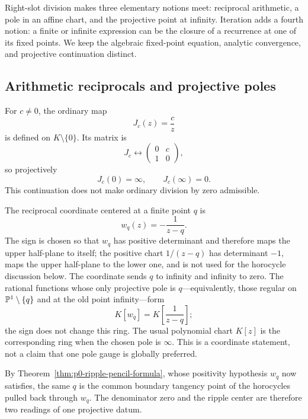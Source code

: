 Right-slot division makes three elementary notions meet: reciprocal
arithmetic, a pole in an affine chart, and the projective point at infinity.
Iteration adds a fourth notion: a finite or infinite expression can be the
closure of a recurrence at one of its fixed points.  We keep the algebraic
fixed-point equation, analytic convergence, and projective continuation
distinct.

\subsection{Arithmetic reciprocals and projective poles}

For $c\ne0$, the ordinary map
\[
  J_c(z)=\frac{c}{z}
\]
is defined on $K\setminus\{0\}$.  Its matrix is
\[
  J_c\leftrightarrow
  \begin{pmatrix}0&c\\1&0\end{pmatrix},
\]
so projectively
\[
  J_c(0)=\infty,
  \qquad
  J_c(\infty)=0.
\]
This continuation does not make ordinary division by zero admissible.

The reciprocal coordinate centered at a finite point $q$ is
\begin{equation}\label{eq:p0-pole-coordinate}
  w_q(z)=-\frac1{z-q}.
\end{equation}
The sign is chosen so that $w_q$ has positive determinant and therefore maps the
upper half-plane to itself; the positive chart $1/(z-q)$ has determinant $-1$,
maps the upper half-plane to the lower one, and is not used for the horocycle
discussion below.  The coordinate sends $q$ to infinity and infinity to zero.
The rational functions whose
only projective pole is $q$---equivalently, those regular on
$\mathbb{P}^1\setminus\{q\}$ and at the old point infinity---form
\[
  K[w_q]=K\!\left[\frac1{z-q}\right];
\]
the sign does not change this ring.  The usual polynomial chart $K[z]$ is the
corresponding ring when the chosen pole is $\infty$.  This is a coordinate
statement, not a claim that one pole gauge is globally preferred.

By Theorem~\ref{thm:p0-ripple-pencil-formula}, whose positivity hypothesis
$w_q$ now satisfies, the same $q$ is the common
boundary tangency point of the horocycles pulled back through $w_q$.  The
denominator zero and the ripple center are therefore two readings of one
projective datum.

